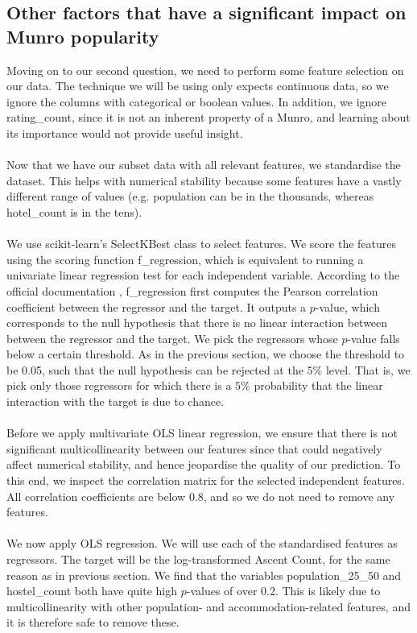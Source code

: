 \documentclass[11pt,a4paper]{article}
\begin{document}
\subsection{Other factors that have a significant impact on Munro popularity}
Moving on to our second question, we need to perform some feature selection on our data. The technique we will be using only expects continuous data, so we ignore the columns with categorical or boolean values. In addition, we ignore rating\_count, since it is not an inherent property of a Munro, and learning about its importance would not provide useful insight. \\ \\
Now that we have our subset data with all relevant features, we standardise the dataset. This helps with numerical stability because some features have a vastly different range of values (e.g. population can be in the thousands, whereas hotel\_count is in the tens). \\ \\
We use scikit-learn's SelectKBest class to select features. We score the features using the scoring function f\_regression, which is equivalent to running a univariate linear regression test for each independent variable. According to the official documentation \cite{scikit-learn}, f\_regression first computes the Pearson correlation coefficient between the regressor and the target. It outputs a $p$-value, which corresponds to the null hypothesis that there is no linear interaction between between the regressor and the target. We pick the regressors whose $p$-value falls below a certain threshold. As in the previous section, we choose the threshold to be 0.05, such that the null hypothesis can be rejected at the $5\%$ level. That is, we pick only those regressors for which there is a $5\%$ probability that the linear interaction with the target is due to chance. \\ \\
Before we apply multivariate OLS linear regression, we ensure that there is not significant multicollinearity between our features since that could negatively affect numerical stability, and hence jeopardise the quality of our prediction. To this end, we inspect the correlation matrix for the selected independent features. All correlation coefficients are below 0.8, and so we do not need to remove any features. \\ \\
We now apply OLS regression. We will use each of the standardised features as regressors. The target will be the log-transformed Ascent Count, for the same reason as in previous section. We find that the variables population\_25\_50 and hostel\_count both have quite high $p$-values of over 0.2. This is likely due to multicollinearity with other population- and accommodation-related features, and it is therefore safe to remove these. \\  \\
\end{document}
